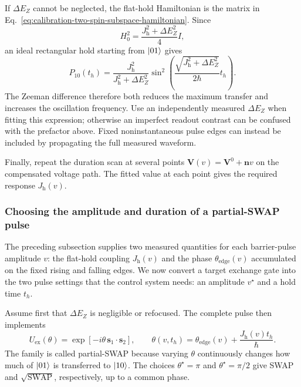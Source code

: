 If $\Delta E_Z$ cannot be neglected, the flat-hold Hamiltonian is
the matrix in
Eq.~\eqref{eq:calibration-two-spin-subspace-hamiltonian}. Since
\[
 H_0^2=\frac{J_{\mathrm h}^2+\Delta E_Z^2}{4}I,
\]
an ideal rectangular hold starting from $\lvert 01\rangle$ gives
\begin{equation}
 P_{10}(t_h)=
 \frac{J_{\mathrm h}^2}{J_{\mathrm h}^2+\Delta E_Z^2}
 \sin^2\!\left(
  \frac{\sqrt{J_{\mathrm h}^2+\Delta E_Z^2}}{2\hbar}t_h
 \right).
 \label{eq:calibration-exchange-gradient-scan}
\end{equation}
The Zeeman difference therefore both reduces the maximum transfer
and increases the oscillation frequency. Use an independently
measured $\Delta E_Z$ when fitting this expression; otherwise an
imperfect readout contrast can be confused with the prefactor above.
Fixed noninstantaneous pulse edges can instead be included by
propagating the full measured waveform.

Finally, repeat the duration scan at several points
$\mathbf V(v)=\mathbf V^0+\mathbf n v$ on the compensated voltage
path. The fitted value at each point gives the required response
$J_{\mathrm h}(v)$.

\subsubsection{Choosing the amplitude and duration of a partial-SWAP pulse}
\label{sec:calibration-partial-swap}

The preceding subsection supplies two measured quantities for each
barrier-pulse amplitude $v$: the flat-hold coupling $J_{\mathrm h}(v)$
and the phase $\theta_{\mathrm{edge}}(v)$ accumulated on the fixed
rising and falling edges. We now convert a target exchange gate into
the two pulse settings that the control system needs: an amplitude
$v^\star$ and a hold time $t_h$.

Assume first that $\Delta E_Z$ is negligible or refocused. The
complete pulse then implements
\begin{equation}
 U_{\mathrm{ex}}(\theta)
 =\exp[-i\theta\,\mathbf s_1\cdot\mathbf s_2],\qquad
 \theta(v,t_h)=\theta_{\mathrm{edge}}(v)
                 +\frac{J_{\mathrm h}(v)t_h}{\hbar}.
 \label{eq:calibration-complete-exchange-pulse}
\end{equation}
The family is called partial-SWAP because varying $\theta$ continuously
changes how much of $\lvert 01\rangle$ is transferred to $\lvert 10\rangle$.
The choices $\theta^\star=\pi$ and $\theta^\star=\pi/2$ give SWAP and
$\sqrt{\mathrm{SWAP}}$, respectively, up to a common phase.

